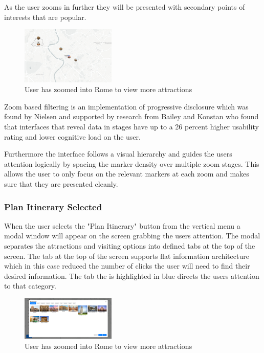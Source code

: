 \documentclass[]{project_final}
\begin{document}
As the user zooms in further they will be presented with secondary points of interests that are popular.

\begin{figure}[H]
    \centering
    \includegraphics[width=0.4\textwidth]{biggerzoom.png}
    \caption{User has zoomed into Rome to view more attractions}
    \label{fig:1}
\end{figure}

Zoom based filtering is an implementation of progressive disclosure which was found by Nielsen and supported by research from Bailey and Konstan who found that interfaces that reveal data in stages have up to a 26 percent higher usability rating and lower cognitive load on the user.

Furthermore the interface follows a visual hierarchy and guides the users attention logically by spacing the marker density over multiple zoom stages. This allows the user to only focus on the relevant markers at each zoom and makes sure that they are presented cleanly.

\subsubsection{Plan Itinerary Selected}

When the user selects the "Plan Itinerary" button from the vertical menu a modal window will appear on the screen grabbing the users attention.
The modal separates the attractions and visiting options into defined tabs at the top of the screen. The tab at the top of the screen supports flat information architecture which in this case reduced the number of clicks the user will need to find their desired information. The tab the is highlighted in blue directs the users attention to that category.

\begin{figure}[H]
    \centering
    \includegraphics[width=0.4\textwidth]{planItin.png}
    \caption{User has zoomed into Rome to view more attractions}
    \label{fig:1}
\end{figure}
\end{document}
